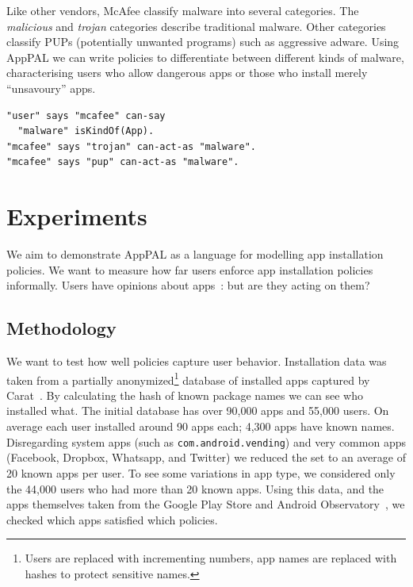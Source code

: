 \documentclass[]{soups-poster}
\newcommand{\citep}[1]{\cite{#1}}
\begin{document}
Like other vendors, McAfee classify malware into several categories.
The \emph{malicious} and \emph{trojan} categories describe traditional malware.
Other categories classify PUPs (potentially unwanted programs) such as aggressive adware.
Using AppPAL we can write policies to differentiate between different kinds of malware,
characterising users who allow dangerous apps or those who install merely ``unsavoury'' apps.
\begin{lstlisting}
"user" says "mcafee" can-say
  "malware" isKindOf(App).
"mcafee" says "trojan" can-act-as "malware".
"mcafee" says "pup" can-act-as "malware".
\end{lstlisting}

%

\section{Experiments}

We aim to demonstrate AppPAL as a language for modelling app installation policies.
We want to measure how far users enforce app installation policies informally.
Users have opinions about apps~\citep{Sadeh:2014vq}: but are they acting on them?

\subsection{Methodology}

We want to test how well policies capture user behavior.
Installation data was taken from a partially anonymized\footnote{Users are replaced with incrementing numbers, app names are replaced with hashes to protect sensitive names.} database of installed apps captured by Carat~\citep{Oliner:2013ht}.
By calculating the hash of known package names we can see who installed what.
%
The initial database has over 90,000 apps and 55,000 users.
On average each user installed around 90 apps each; 4,300 apps have known names.
Disregarding system apps (such as \texttt{com.android.vending}) and very common apps (Facebook, Dropbox, Whatsapp, and Twitter) we reduced the set to an average of 20 known apps per user.
To see some variations in app type, we considered only the 44,000 users who had more than 20 known apps.
Using this data, and the apps themselves taken from the Google Play Store and Android Observatory~\citep{Barrera:2012iba}, we checked which apps satisfied which policies.
\end{document}
